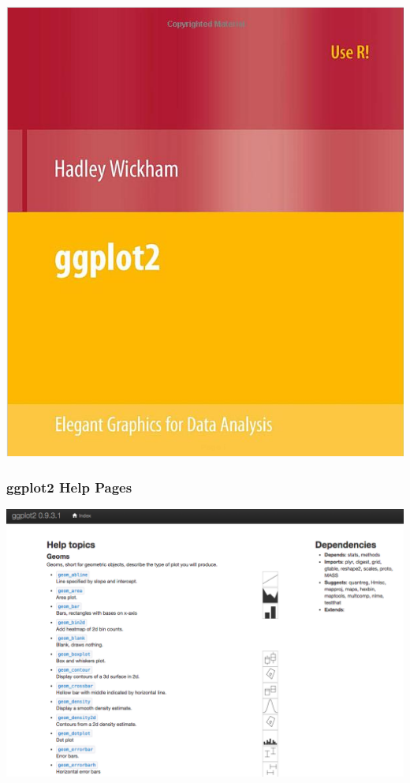 \documentclass{beamer}\usepackage[]{graphicx}\usepackage[]{color}
\begin{document}
\begin{frame}[fragile]
\begin{center}
\includegraphics[scale=.15]{images/hadley.png}
\end{center}
\end{frame}


\begin{frame}[fragile]
\frametitle{ggplot2 Help Pages}
\begin{center}
\includegraphics[scale=.5]{images/ggplot_help.png}
\end{center}
\end{frame}
\end{document}
